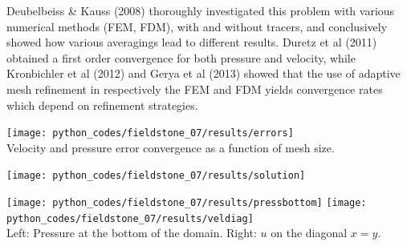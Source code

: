 Deubelbeiss \& Kauss (2008) \cite{deka08} thoroughly investigated this problem with various 
numerical methods (FEM, FDM), with and without tracers, 
and conclusively showed how various averagings lead to different results. 
Duretz et al (2011) \cite{dumg11} obtained a first order convergence for both pressure and velocity, 
while Kronbichler et al (2012) \cite{krhb12}
and Gerya et al (2013) \cite{gemd13} showed that the use of adaptive mesh refinement in respectively the FEM and FDM 
yields convergence rates which depend on refinement strategies. 

\begin{center}
\texttt{[image: python\_codes/fieldstone\_07/results/errors]}\\
{\captionfont Velocity and pressure error convergence as a function of mesh size.}
\end{center}

\texttt{[image: python\_codes/fieldstone\_07/results/solution]}

\begin{center}
\texttt{[image: python\_codes/fieldstone\_07/results/pressbottom]}
\texttt{[image: python\_codes/fieldstone\_07/results/veldiag]}\\
{\captionfont Left: Pressure at the bottom of the domain. Right: $u$ on the diagonal $x=y$.}
\end{center}

